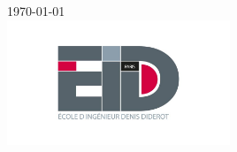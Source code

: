 \documentclass[11pt]{article}
\begin{document}
\begin{titlepage}
{\large \today}\\[0.1cm] %


\includegraphics[width=0.5\textwidth]{figures/eidd.jpeg}\\[0cm] %
 

\vfill %

\end{titlepage}








\end{document}
